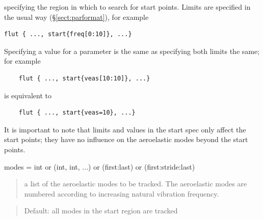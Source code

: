 \documentclass[11pt,openany,twoside]{book}
\numberwithin{equation}{section}		%
\newcommand{\Subst}[1]{{\small\sf #1}}
\newcommand{\Spec}[1]{{\small\ttfamily #1}}
\newcommand{\Rhs}[1]{\Subst{#1}}
\newcommand{\Intlist}{\Rhs{int or (int, int, ...) or (first:last) or (first:stride:last) }}
\newcommand{\Sectref}[1]{\S\ref{#1}}
\begin{document}
specifying the region in which to search for start points.
Limits are specified in the usual way (\Sectref{sect:parformat}), for example
\begin{lstlisting}
flut { ..., start{freq[0:10]}, ...}
\end{lstlisting}

Specifying a value for a parameter is the same as specifying
both limits the same; for example
\begin{lstlisting}
    flut { ..., start{veas[10:10]}, ...}
\end{lstlisting}
is equivalent to
\begin{lstlisting}
    flut { ..., start{veas=10}, ...}
\end{lstlisting}
It is important to note that limits and values in the \Spec{start}
spec only affect the start points; they have no influence on the
aeroelastic modes beyond the start points.

\par
\Spec{modes} = \Intlist
\begin{quote}
\par
a list of the aeroelastic modes to be tracked.
The aeroelastic modes are numbered according to increasing natural
vibration frequency.
\end{quote}

\begin{quote}
Default: all modes in the start region are tracked
\end{quote}
\end{document}
